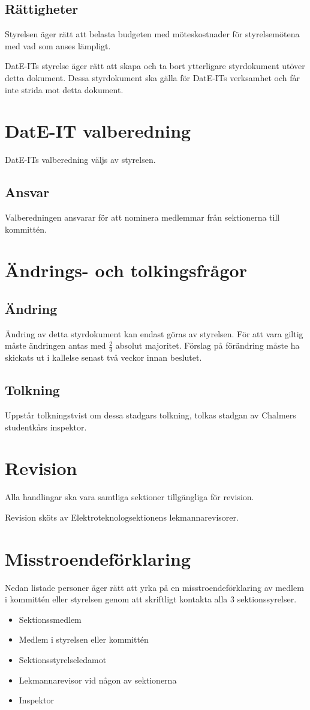 \documentclass{article}
\begin{document}
\subsection{Rättigheter}
Styrelsen äger rätt att belasta budgeten med möteskostnader för styrelsemötena med vad som anses lämpligt.

DatE-ITs styrelse äger rätt att skapa och ta bort ytterligare styrdokument utöver detta dokument. Dessa styrdokument ska gälla för DatE-ITs verksamhet och får inte strida mot detta dokument.

\section{DatE-IT valberedning}
DatE-ITs valberedning väljs av styrelsen. 

\subsection{Ansvar}
Valberedningen ansvarar för att nominera medlemmar från sektionerna till kommittén.

\section{Ändrings- och tolkingsfrågor}
\subsection{Ändring}
Ändring av detta styrdokument kan endast göras av styrelsen. För att vara giltig måste ändringen antas med $\frac{2}{3}$ absolut majoritet. Förslag på förändring måste ha skickats ut i kallelse senast två veckor innan beslutet.

\subsection{Tolkning}
Uppstår tolkningstvist om dessa stadgars tolkning, tolkas stadgan av Chalmers studentkårs inspektor.

\section{Revision}
Alla handlingar ska vara samtliga sektioner tillgängliga för revision.

Revision sköts av Elektroteknologsektionens lekmannarevisorer.

\section{Misstroendeförklaring}
Nedan listade personer äger rätt att yrka på en misstroendeförklaring av medlem i kommittén eller styrelsen genom att skriftligt kontakta alla 3 sektionssyrelser. 
\begin{itemize}
    \item Sektionssmedlem
    \item Medlem i styrelsen eller kommittén
    \item Sektionsstyrelseledamot
    \item Lekmannarevisor vid någon av sektionerna
    \item Inspektor
\end{itemize}
\end{document}
